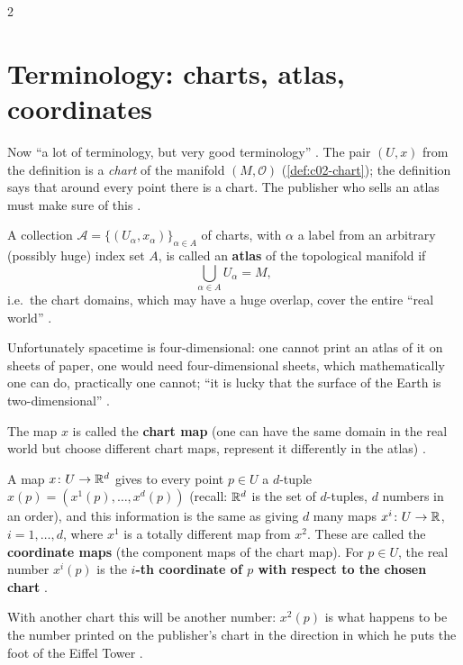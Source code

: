\begin{paracol}{2}
\section{Terminology: charts, atlas, coordinates}\label{sec:c02-terminology}

Now ``a lot of terminology, but very good terminology'' . The pair $(U,x)$ from the definition is a \emph{chart} of the manifold $(M,\mathcal O)$ (\cref{def:c02-chart}); the definition
says that around every point there is a chart. The publisher who sells an atlas must make sure of this .

\begin{definition}\label{def:c02-atlas}
A collection $\mathcal A=\{(U_\alpha,x_\alpha)\}_{\alpha\in A}$ of charts, with $\alpha$ a label from an arbitrary (possibly huge) index set $A$, is called an \textbf{atlas} of the topological manifold if
\[
  \bigcup_{\alpha\in A}U_\alpha=M,
\]
i.e.\ the chart domains, which may have a huge overlap, cover the entire ``real world'' .
\end{definition}
Unfortunately spacetime is four-dimensional: one cannot print an atlas of it on sheets of paper, one would need four-dimensional sheets, which mathematically one can do, practically one cannot; ``it is lucky that the surface of the Earth is
two-dimensional'' .

The map $x$ is called the \textbf{chart map} (one can have the same domain in the real world but choose different chart maps, represent it differently in the atlas) .

\begin{definition}\label{def:c02-coordinates}
A map $x\colon U\to\mathbb{R}^d$ gives to every point $p\in U$ a $d$-tuple $x(p)=(x^1(p),\dots,x^d(p))$ (recall: $\mathbb{R}^d$ is the set of $d$-tuples, $d$ numbers in an order), and
this information is the same as giving $d$ many maps $x^i\colon U\to\mathbb{R}$, $i=1,\dots,d$, where $x^1$ is a totally different map from $x^2$. These are called the \textbf{coordinate maps}
(the component maps of the chart map). For $p\in U$, the real number $x^i(p)$ is the \textbf{$i$-th coordinate of $p$ with respect to the chosen chart}
.
\end{definition}
With another chart this will be another number: $x^2(p)$ is what happens to be the number printed on the publisher's chart in the direction in which he puts the foot of the Eiffel Tower .


\end{paracol}
